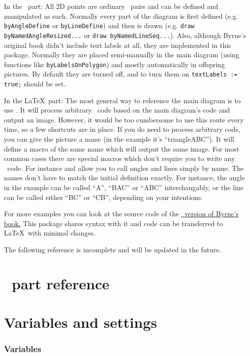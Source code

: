 \documentclass{ltxdoc}
\begin{document}
In the \METAPOST\ part: 
All 2D points are ordinary \METAPOST\ pairs and can be defined and manipulated as such. Normally every part of the diagram is first defined (e.g. \texttt{byAngleDefine} or \texttt{byLineDefine}) and then is drawn (e.g. \texttt{draw byNamedAngleResized...} or \texttt{draw byNamedLineSeq...}). Also, although Byrne's original book didn't include text labels at all, they are implemented in this package. Normally they are placed semi-manually in the main diagram (using functions like \texttt{byLabelsOnPolygon}) and mostly automatically in offspring pictures. By default they are turned off, and to turn them on \texttt{textLabels := true;} should be set.

In the \LaTeX\ part: 
The most general way to reference the main diagram is to use . It will process arbitrary \METAPOST\ code based on the main diagram's code and output an image. However, it would be too cumbersome to use this route every time, so a few shortcuts are in place. If you do need to process arbitrary code, you can give the picture a name (in the example it's ``triangleABC''). It will define a macro of the same name  which will output the same image. For most common cases there are special macros which don't require you to write any \METAPOST\ code. For instance  and  allow you to call angles and lines simply by name. The names don't have to match the initial definition exactly. For instance, the angle in the example can be called ``A'', ``BAC'' or ``ABC'' interchangably, or the line can be called either ``BC'' or ``CB'', depending on your intentions.

For more examples you can look at the source code of the \href{https://github.com/jemmybutton/byrne-euclid/}{\ConTeXt\ version of Byrne's book.} This package shares syntax with it and code can be transferred to \LaTeX\ with minimal changes.

The following reference is incomplete and will be updated in the future.

\section{\METAPOST\ part reference}

\section{Variables and settings}

\subsubsection{Variables}
	
\end{document}
